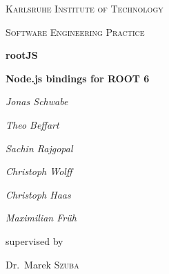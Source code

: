 \begin{titlepage}
	\centering
	{\scshape\LARGE Karlsruhe Institute of Technology \par}
	\vspace{1cm}
	{\scshape\Large Software Engineering Practice\par}
	\vspace{1.5cm}
	{\Huge\bfseries rootJS\par}
	\vspace{0.25cm}
	{\Large\bfseries Node.js bindings for ROOT 6\par}
	\vspace{2cm}
	{\Large\itshape Jonas Schwabe\par}
	{\Large\itshape Theo Beffart\par}
	{\Large\itshape Sachin Rajgopal\par}
	{\Large\itshape Christoph Wolff\par}
	{\Large\itshape Christoph Haas\par}
	
	{\Large\itshape Maximilian Fr\"uh\par}
	\vfill
	supervised by\par
	Dr.~Marek \textsc{Szuba}
	
	\vfill
	
	{\large \date{30.11.2015}\par}
\end{titlepage}
